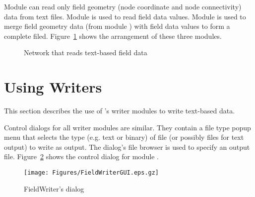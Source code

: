 Module  can read only field geometry (node
coordinate and node connectivity) data from text files.  Module
 is used to read field data values.  Module
 is used to merge field geometry data (from
module ) with field data values to form a complete
filed.  Figure~\ref{fig:ReadFieldNet} shows the arrangement of these
three modules.

\begin{figure}[htb]
  \centering
  \begin{makeimage} \end{makeimage}
  \ReadFieldNet
  \caption{\label{fig:ReadFieldNet} Network that reads text-based field data}
\end{figure}

\section{Using Writers}
\label{sec:using_writers}

\newcommand{\FieldWriterGUI}{%
  \centerline{\texttt{[image: Figures/FieldWriterGUI.eps.gz]}}
}
\begin{htmlonly}
  \newcommand{\FieldWriterGUI}{%
    \htmladdimg[alt="FieldWriter dialog"]{../Figures/FieldWriterGUI.gif}
  }
\end{htmlonly}

\newcommand{\WriteFieldNet}{%
  \centerline{\texttt{[image: Figures/WriteFieldNet.eps.gz]}}
}
\begin{htmlonly}
  \newcommand{\WriteFieldNet}{%
    \htmladdimg[alt="Network that reads a text-based field"]{../Figures/WriteFieldNet.gif}
  }
\end{htmlonly}

This section describes the use of \sr{}'s writer modules to write
text-based data.

Control dialogs for all writer modules are similar.  They contain a
file type popup menu that selects the type (e.g. text or binary) of
file (or possibly files for text output) to write as output.  The
dialog's file browser is used to specify an output file.
Figure~\ref{fig:FieldWriterGUI} shows the control dialog for module
.

\begin{figure}[htb]
  \centering
  \begin{makeimage} \end{makeimage}
  \FieldWriterGUI
  \caption{\label{fig:FieldWriterGUI} FieldWriter's dialog}
\end{figure}

